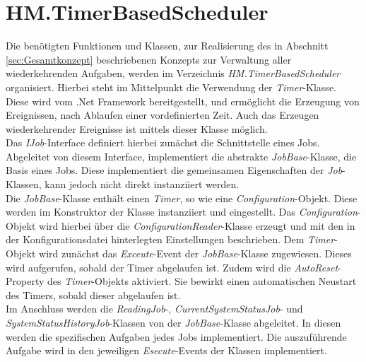 \newpage
\section{HM.TimerBasedScheduler}
Die benötigten Funktionen und Klassen, zur Realisierung des in Abschnitt \ref{sec:Gesamtkonzept} beschriebenen Konzepts zur Verwaltung aller wiederkehrenden Aufgaben, werden im Verzeichnis \textit{HM.TimerBasedScheduler} organisiert. Hierbei steht im Mittelpunkt die Verwendung der \textit{Timer}-Klasse. Diese wird vom .Net Framework bereitgestellt, und ermöglicht die Erzeugung von Ereignissen, nach Ablaufen einer vordefinierten Zeit. Auch das Erzeugen wiederkehrender Ereignisse ist mittels dieser Klasse möglich. \cite{SystemTimers}\\
Das \textit{IJob}-Interface definiert hierbei zunächst die Schnittstelle eines Jobs. Abgeleitet von diesem Interface, implementiert die abstrakte \textit{JobBase}-Klasse, die Basis eines Jobs. Diese implementiert die gemeinsamen Eigenschaften der \textit{Job}-Klassen, kann jedoch nicht direkt instanziiert werden.\\ 
Die \textit{JobBase}-Klasse enthält einen \textit{Timer}, so wie eine \textit{Configuration}-Objekt. Diese werden im Konstruktor der Klasse instanziiert und eingestellt. Das \textit{Configuration}-Objekt wird hierbei über die \textit{ConfigurationReader}-Klasse erzeugt und mit den in der Konfigurationsdatei hinterlegten Einstellungen beschrieben. Dem \textit{Timer}-Objekt wird zunächst das \textit{Exceute}-Event der \textit{JobBase}-Klasse zugewiesen. Dieses wird aufgerufen, sobald der Timer abgelaufen ist. Zudem wird die \textit{AutoReset}-Property des \textit{Timer}-Objekts aktiviert. Sie bewirkt einen automatischen Neustart des Timers, sobald dieser abgelaufen ist.\\
Im Anschluss werden die \textit{ReadingJob}-, \textit{CurrentSystemStatusJob}- und \textit{SystemStatusHistoryJob}-Klassen von der \textit{JobBase}-Klasse abgeleitet. In diesen werden die spezifischen Aufgaben jedes Jobs implementiert. Die auszuführende Aufgabe wird in den jeweiligen \textit{Esecute}-Events der Klassen implementiert.\\
\vspace{-1cm}
